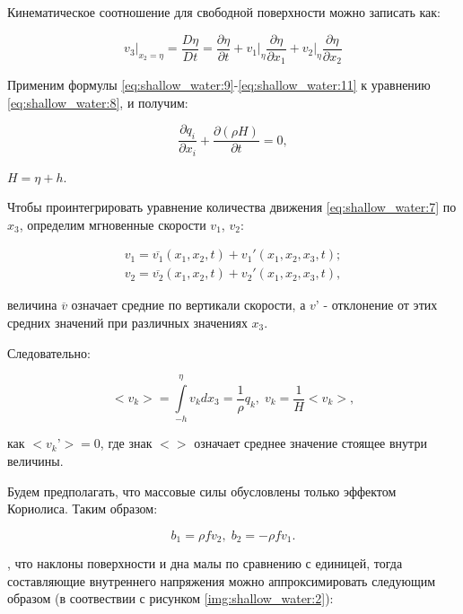 \documentclass[14pt]{extreport}
\begin{document}
Кинематическое соотношение для свободной поверхности можно записать как:

\begin{equation}\label{eq:shallow_water:11}
v_3\bigg|_{x_2=\eta} = \frac{D\eta}{Dt} = \frac{\partial \eta}{\partial t} + v_1 \bigg|_{\eta} \frac{\partial \eta}{\partial x_1} + v_2 \bigg|_{\eta}\frac{\partial \eta}{\partial x_2}
\end{equation}

Применим формулы \ref{eq:shallow_water:9}-\ref{eq:shallow_water:11} к уравнению \ref{eq:shallow_water:8}, и получим:

\begin{equation}\label{eq:shallow_water:12}
\frac{ \partial q_i}{\partial x_i} + \frac{\partial(\rho H)}{\partial t} = 0,
\end{equation}

 $H=\eta+h$.

Чтобы проинтегрировать уравнение количества движения \ref{eq:shallow_water:7} по $x_3$, определим мгновенные скорости $v_1$, $v_2$:

\begin{equation}\label{eq:shallow_water:13}
\begin{aligned}
v_1 = \overline{v_1} (x_1, x_2, t) + v_1'(x_1, x_2, x_3, t);\\
v_2 = \overline{v_2} (x_1, x_2, t) + v_2'(x_1, x_2, x_3, t),
\end{aligned}
\end{equation}

 величина $\overline{v}$ означает средние по вертикали скорости, а $v’$ - отклонение от этих средних значений при различных значениях $x_3$.

Следовательно:

\begin{equation}\label{eq:shallow_water:14}
<v_k>=\int\limits^\eta_{-h} v_k dx_3 = \frac{1}{\rho} q_k, \; v_k=\frac{1}{H}<v_k>,
\end{equation}

 как $<v_k’> = 0$, где знак $<>$ означает среднее значение стоящее внутри величины.

Будем предполагать, что массовые силы обусловлены только эффектом Кориолиса. Таким образом:

\begin{equation}\label{eq:shallow_water:15}
b_1 = \rho f v_2, \; b_2 = - \rho f v_1.
\end{equation}

, что наклоны поверхности и дна малы по сравнению с единицей, тогда составляющие внутреннего напряжения можно аппроксимировать следующим образом (в соотвествии с рисунком \ref{img:shallow_water:2}):
\end{document}
